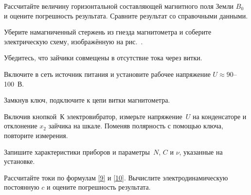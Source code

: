 \begin{lab:task}
        \item Рассчитайте величину горизонтальной составляющей магнитного поля
        Земли $B_0$ и оцените погрешность результата.
        Сравните результат со справочными данными.



        \item Уберите намагниченный стержень из гнезда магнитометра и соберите
электрическую схему, изображённую на рис.~.

        \item Убедитесь, что зайчики совмещены в отсутствие тока через витки.

        \item Включите в сеть источник питания и установите рабочее напряжение
$U\approx 90$--100~В.

        \item Замкнув ключ, подключите к цепи витки магнитометра.

        \item Включив кнопкой~К электровибратор, измерьте напряжение~$U$ на
конденсаторе и отклонение $x_2$ зайчика на шкале.
        Поменяв полярность с помощью ключа, повторите измерения.

        \item Запишите характеристики приборов и параметры~$N$, $C$ и $\nu$,
указанные на установке.

        \item Рассчитайте токи по формулам \eqref{9} и \eqref{10}.
        Вычислите электродинамическую постоянную $c$ и оцените погрешность
        результата.
\end{lab:task}


